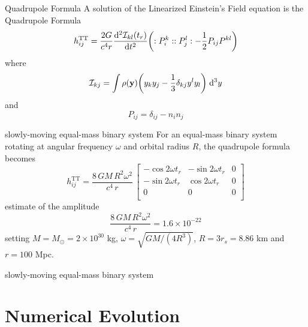 \documentclass{beamer}
\newcommand{\bea}{\setlength{\jot}{10pt}\begin{eqnarray*}}
\newcommand{\eea}{\end{eqnarray*}}
\theoremstyle{definition}
\theoremstyle{plain}
\begin{document}
\begin{frame}{Quadrupole Formula}
A solution of the Linearized Einstein's Field equation is the Quadrupole Formula
\bea
h^{\text{TT}}_{ij} = \dfrac{2G}{c^{4}r} \dv[2]{\mathcal{I}_{kl}(t_r)}{t} \qty(:P_{i}^{k}::P_{j}^{l}: - \dfrac{1}{2} P_{ij} P^{kl})
\eea
where
\[
\mathcal{I} _{kj} = \int \rho(\vb{y}) \qty(y_{k} y_{j} - \dfrac{1}{3}\delta_{kj} y^{l} y_{l} ) \; \dd[3] y
\]
and
\[
P_{i j} = \delta_{i j} - n_{i} n_{j}
\]
\end{frame}

\begin{frame}{slowly-moving equal-mass binary system}
For an equal-mass binary system rotating at angular frequency $\omega$ and orbital radius $R$, the quadrupole formula becomes
\[
h^{\text{TT}} _{ij} = \frac{8\,G M \,R^{2} \omega^{2}}{c^{4}\, r} \,
\begin{bmatrix}
- \cos 2 \omega t_r   &
 - \sin 2 \omega t_r &
0
\\
  -\sin 2 \omega t_r &
 \cos 2 \omega t_r &
0
\\
0 & 0 & 0\\
\end{bmatrix}
\]
estimate of the amplitude
\[
\frac{8\,G M \,R^{2} \omega^{2}}{c^{4}\, r} = 1.6 \times 10^{-22}
\]
setting $M=M_{\odot}=2 \times 10^{30}$ kg, $\omega=\sqrt{GM/(4R^{3})}$, $R = 3r_s=8.86 $ km and $r =100$ Mpc.
\end{frame}

\begin{frame}{slowly-moving equal-mass binary system}
\begin{figure}
    \centering
    \end{figure}
\end{frame}


\section{Numerical Evolution}
\end{document}
